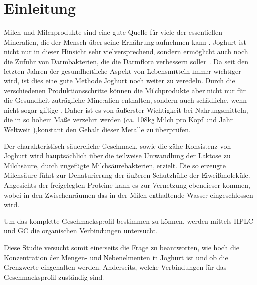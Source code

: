 \section{Einleitung}
Milch und Milchprodukte sind eine gute Quelle für viele der essentiellen Mineralien, die der Mensch über seine Ernährung aufnehmen kann \cite{goIn}. Joghurt ist nicht nur in dieser Hinsicht sehr vielversprechend, sondern ermöglicht auch noch die Zufuhr von Darmbakterien, die die Darmflora verbessern sollen \cite{probiHe}. Da seit den letzten Jahren der gesundheitliche Aspekt von Lebensmitteln immer wichtiger wird, ist dies eine gute Methode Joghurt noch weiter zu veredeln. Durch die verschiedenen Produktionsschritte können die Milchprodukte aber nicht nur für die Gesundheit zuträgliche Mineralien enthalten, sondern auch schädliche, wenn nicht sogar giftige \cite{heMeCon}. Daher ist es von äußerster Wichtigkeit bei Nahrungsmitteln, die in so hohem Maße verzehrt werden (ca. 108kg Milch pro Kopf und Jahr Weltweit \cite{wDSit}),konstant den Gehalt dieser Metalle zu überprüfen. 
 
Der charakteristisch säuereliche Geschmack, sowie die zähe Konsistenz von Joghurt wird hauptsächlich über die teilweise Umwandlung der Laktose zu Milchsäure, durch zugefügte Milchsäurebakterien, erzielt. Die so erzeugte Milchsäure führt zur Denaturierung der äußeren Schutzhülle der Eiweißmoleküle. Angesichts der freigelegten Proteine kann es zur Vernetzung ebendieser kommen, wobei in den Zwischenräumen das in der Milch enthaltende Wasser eingeschlossen wird. 

Um das komplette Geschmacksprofil bestimmen zu können, werden mittels HPLC und GC die
organischen Verbindungen untersucht.

Diese Studie versucht somit einerseits die Frage zu beantworten, wie hoch die Konzentration der Mengen- und Nebenelmenten in Joghurt ist und ob die Grenzwerte \cite{refWerte} eingehalten werden.
Anderseits, welche Verbindungen für das Geschmacksprofil zuständig sind.
